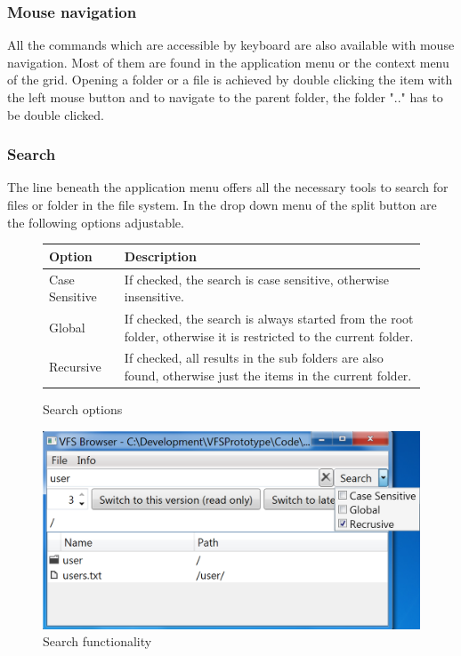 \documentclass[a4paper,12pt]{article}
\begin{document}
\subsubsection{Mouse navigation}
All the commands which are accessible by keyboard are also available with mouse navigation.
Most of them are found in the application menu or the context menu of the grid. Opening a folder or a file is achieved by double clicking the item with the left mouse button and to navigate to the parent folder, the folder ".." has to be double clicked. 

\subsubsection{Search}	
The line beneath the application menu offers all the necessary tools to search for files or folder in the file system. In the drop down menu of the split button are the following options adjustable.
\begin{figure}[h!]
	\centering
	\begin{tabular}{| l | p{10cm} |}
		\hline
		\textbf{Option} & \textbf{Description} \\ \hline \hline
		Case Sensitive & If checked, the search is case sensitive, otherwise insensitive. \\ \hline
		Global & If checked, the search is always started from the root folder, otherwise it is restricted to the current folder. \\ \hline
		Recursive & If checked, all results in the sub folders are also found, otherwise just the items in the current folder. \\ \hline
		\end{tabular}
	\caption{Search options}
\end{figure}

\begin{figure}[h!]
  \centering
  \includegraphics[scale=0.35]{Images/search.png} 
  \caption{Search functionality}
\end{figure}
\end{document}
